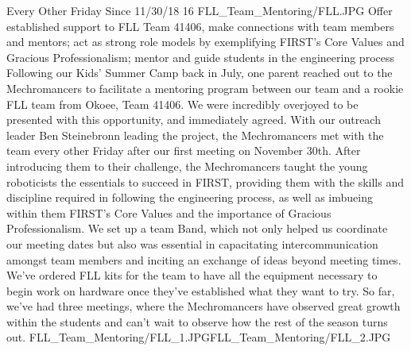 {Every Other Friday Since 11/30/18}
{16}
{FLL_Team_Mentoring/FLL.JPG}
{Offer established support to FLL Team 41406, make connections with team members and mentors; act as strong role models by exemplifying FIRST's Core Values and Gracious Professionalism; mentor and guide students in the engineering process} 
{
Following our Kids' Summer Camp back in July, one parent reached out to the Mechromancers to facilitate a mentoring program between our team and a rookie FLL team from Okoee, Team 41406. We were incredibly overjoyed to be presented with this opportunity, and immediately agreed. With our outreach leader Ben Steinebronn leading the project, the Mechromancers met with the team every other Friday after our first meeting on November 30th. After introducing them to their challenge, the Mechromancers taught the young roboticists the essentials to succeed in FIRST, providing them with the skills and discipline required in following the engineering process, as well as imbueing within them FIRST's Core Values and the importance of Gracious Professionalism. We set up a team Band, which not only helped us coordinate our meeting dates but also was essential in capacitating intercommunication amongst team members and inciting an exchange of ideas beyond meeting times. We've ordered FLL kits for the team to have all the equipment necessary to begin work on hardware once they've established what they want to try. So far, we've had three meetings, where the Mechromancers have observed great growth within the students and can't wait to observe how the rest of the season turns out. 
} 
{FLL_Team_Mentoring/FLL_1.JPG}{FLL_Team_Mentoring/FLL_2.JPG}